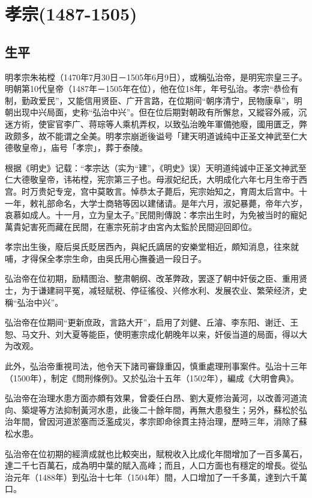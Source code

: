 
\section{孝宗\tiny(1487-1505)}

\subsection{生平}

明孝宗朱祐樘（1470年7月30日－1505年6月9日），或稱弘治帝，是明宪宗皇三子。明朝第10代皇帝（1487年－1505年在位），他在位18年，年号弘治。孝宗“恭俭有制，勤政爱民”，又能信用贤臣、广开言路，在位期间“朝序清宁，民物康阜”，明朝出现中兴局面，史称“弘治中兴”。但在位后期對朝政有所懈怠，又縱容外戚，沉迷方術，使宦官李广、蒋琮等人乘机弄权，以致弘治晚年軍備弛廢，國用匱乏，弊政颇多，故不能谓之全美。明孝宗崩逝後谥号「建天明道诚纯中正圣文神武至仁大德敬皇帝」，庙号「孝宗」，葬于泰陵。

根据《明史》记载：“孝宗达（实为“建”，《明史》误）天明道纯诚中正圣文神武至仁大德敬皇帝，讳祐樘，宪宗第三子也。母淑妃纪氏，大明成化六年七月生帝于西宫。时万贵妃专宠，宫中莫敢言。悼恭太子薨后，宪宗始知之，育周太后宫中。十一年，敕礼部命名，大学士商辂等因以建储请。是年六月，淑妃暴薨，帝年六岁，哀慕如成人。十一月，立为皇太子。”民間則傳說：孝宗出生时，为免被当时的寵妃萬貴妃害死而藏在民間，在憲宗死前才由宮內太監於民間迎回即位。

孝宗出生後，廢后吳氏貶居西內，與紀氏謫居的安樂堂相近，頗知消息，往來就哺，才得保全孝宗生命，由吳氏用心撫養過一段日子。

弘治帝在位初期，励精图治、整肃朝纲、改革弊政，罢逐了朝中奸佞之臣、重用贤士，为于谦建祠平冤，减轻赋税、停征徭役、兴修水利、发展农业、繁荣经济，史稱“弘治中兴”。

弘治帝在位期间“更新庶政，言路大开”，启用了刘健、丘濬、李东阳、谢迁、王恕、马文升、刘大夏等能臣，使明憲宗成化朝晚年以来，奸佞当道的局面，得以大为改观。

此外，弘治帝重視司法，他令天下諸司審錄重囚，慎重處理刑事案件。弘治十三年（1500年），制定《問刑條例》。又於弘治十五年（1502年），編成《大明會典》。

弘治帝在治理水患方面亦頗有效果，曾委任白昂、劉大夏修治黃河，以改善河道流向、築堤等方法抑制黃河水患，此後二十餘年間，再無大患發生；另外，蘇松於弘治年間，曾因河道淤塞而泛濫成災，孝宗即命徐貫主持治理，歷時三年，消除了蘇松水患。

弘治帝在位初期的經濟成就也比較突出，賦稅收入比成化年間增加了一百多萬石，達二千七百萬石，成為明中葉的賦入高峰；而且，人口方面也有穩定的增長。從弘治元年（1488年）到弘治十七年（1504年）間，人口增加了一千多萬，達到六千萬口。


